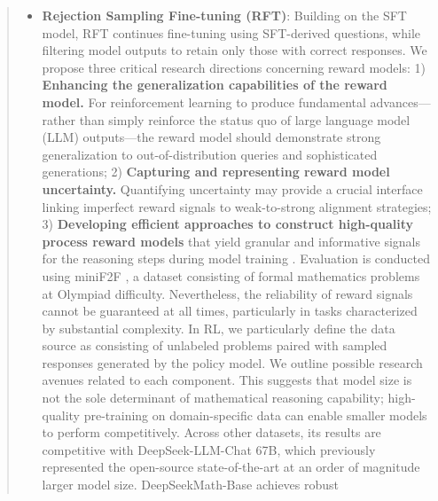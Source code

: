 \begin{abstract}
\begin{itemize}[topsep=0pt]
\begin{itemize}[topsep=0pt]
\begin{itemize}[topsep=0pt]
In this work, we introduce DeepSeekMath, a model that establishes new benchmarks for open-source systems on competition-level MATH tasks and attains near-parity with leading proprietary models. \paragraph{Formal Mathematics}

Recent years have seen increasing emphasis on formal proof automation, which enhances both the accuracy and efficiency of mathematical verification. Additionally, we expand the scope of evaluation to general abilities, assessing the model’s competency in natural language processing, logical reasoning, and software development. This pattern echoes the findings of \citep{wang2023making}, who also reported a \textbf{misalignment problem} for reasoning tasks within SFT models and demonstrated that various preference alignment techniques can successfully improve the reasoning performance of these models \citep{yuan2023rrhf,song2023preference,wang2023making}. In addition, we note improvements in out-of-domain generalization during reinforcement learning. \item \textbf{Rejection Sampling Fine-tuning (RFT)}: Building on the SFT model, RFT continues fine-tuning using SFT-derived questions, while filtering model outputs to retain only those with correct responses. We propose three critical research directions concerning reward models: 1) \textbf{Enhancing the generalization capabilities of the reward model.} For reinforcement learning to produce fundamental advances—rather than simply reinforce the status quo of large language model (LLM) outputs—the reward model should demonstrate strong generalization to out-of-distribution queries and sophisticated generations; 2) \textbf{Capturing and representing reward model uncertainty.} Quantifying uncertainty may provide a crucial interface linking imperfect reward signals to weak-to-strong alignment strategies; 3) \textbf{Developing efficient approaches to construct high-quality process reward models} that yield granular and informative signals for the reasoning steps during model training \citep{lightman2023let,wang2023math}. Evaluation is conducted using miniF2F \citep{minif2f}, a dataset consisting of formal mathematics problems at Olympiad difficulty. Nevertheless, the reliability of reward signals cannot be guaranteed at all times, particularly in tasks characterized by substantial complexity. In RL, we particularly define the data source as consisting of unlabeled problems paired with sampled responses generated by the policy model. We outline possible research avenues related to each component. This suggests that model size is not the sole determinant of mathematical reasoning capability; high-quality pre-training on domain-specific data can enable smaller models to perform competitively. Across other datasets, its results are competitive with DeepSeek-LLM-Chat 67B, which previously represented the open-source state-of-the-art at an order of magnitude larger model size. DeepSeekMath-Base achieves robust 
\end{itemize}
\end{itemize}
\end{itemize}
\end{abstract}
